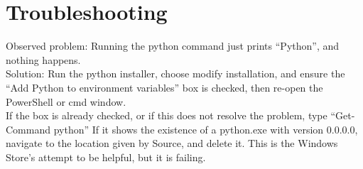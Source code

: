 \documentclass{article}
\begin{document}
\section{Troubleshooting}

Observed problem: Running the python command just prints ``Python'', and nothing happens.
\\
Solution: Run the python installer, choose modify installation, and ensure the ``Add Python to environment variables'' box is checked, then re-open the PowerShell or cmd window.
\\
If the box is already checked, or if this does not resolve the problem, type ``Get-Command python''  If it shows the existence of a python.exe with version 0.0.0.0, navigate to the location given by Source, and delete it.  This is the Windows Store's attempt to be helpful, but it is failing.
\end{document}

